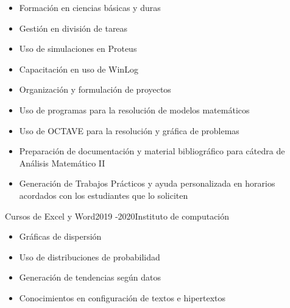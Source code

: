 \documentclass[10pt,a4paper,ragged2e,withhyper]{altacv}
\begin{document}
\begin{paracol}{2}



\begin{itemize}
\item Formación en ciencias básicas y duras
\item Gestión en división de tareas
\item Uso de simulaciones en Proteus
\item Capacitación en uso de WinLog
\item Organización y formulación de proyectos
\item Uso de programas para la resolución de modelos matemáticos
\item Uso de OCTAVE para la resolución y gráfica de problemas

\end{itemize}

\divider

\begin{itemize}
\item Preparación de documentación y material bibliográfico para cátedra de Análisis Matemático II
\item Generación de Trabajos Prácticos y ayuda personalizada en horarios acordados con los estudiantes que lo soliciten
\end{itemize}

\divider

 {Cursos de Excel y Word}{2019 -2020}{Instituto de computación}

\begin{itemize}
\item Gráficas de dispersión
\item Uso de distribuciones de probabilidad
\item Generación de tendencias según datos
\item Conocimientos en configuración de textos e hipertextos 
\end{itemize}

\divider


\end{paracol}
\end{document}
